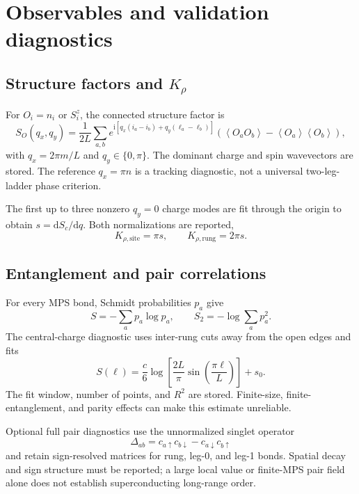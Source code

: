 \documentclass[11pt]{article}
\newcommand{\mean}[1]{\left\langle #1\right\rangle}
\newcommand{\dd}{\mathrm d}
\begin{document}
\section{Observables and validation diagnostics}
\label{sec:diagnostics}

\subsection{Structure factors and \texorpdfstring{\(K_\rho\)}{K rho}}

For \(O_i=n_i\) or \(S_i^z\), the connected structure factor is
\begin{equation}
 S_O(q_x,q_y)=\frac{1}{2L}\sum_{a,b}
 e^{\mathrm{i}[q_x(i_a-i_b)+q_y(\ell_a-\ell_b)]}
 \left(\mean{O_aO_b}-\mean{O_a}\mean{O_b}\right),
\end{equation}
with \(q_x=2\pi m/L\) and \(q_y\in\{0,\pi\}\).  The dominant charge and spin
wavevectors are stored.  The reference \(q_x=\pi n\) is a tracking diagnostic,
not a universal two-leg-ladder phase criterion.

The first up to three nonzero \(q_y=0\) charge modes are fit through the origin
to obtain \(s=\dd S_c/\dd q\).  Both normalizations are reported,
\begin{equation}
 K_{\rho,\mathrm{site}}=\pi s,
 \qquad K_{\rho,\mathrm{rung}}=2\pi s.
\end{equation}

\subsection{Entanglement and pair correlations}

For every MPS bond, Schmidt probabilities \(p_a\) give
\begin{equation}
 S=-\sum_ap_a\log p_a,
 \qquad S_2=-\log\sum_ap_a^2.
\end{equation}
The central-charge diagnostic uses inter-rung cuts away from the open edges and
fits
\begin{equation}
 S(\ell)=\frac{c}{6}\log\left[\frac{2L}{\pi}
              \sin\left(\frac{\pi\ell}{L}\right)\right]+s_0.
\end{equation}
The fit window, number of points, and \(R^2\) are stored.  Finite-size,
finite-entanglement, and parity effects can make this estimate unreliable.

Optional full pair diagnostics use the unnormalized singlet operator
\begin{equation}
 \Delta_{ab}=c_{a\uparrow}c_{b\downarrow}
             -c_{a\downarrow}c_{b\uparrow}
\end{equation}
and retain sign-resolved matrices for rung, leg-0, and leg-1 bonds.  Spatial
decay and sign structure must be reported; a large local value or finite-MPS
pair field alone does not establish superconducting long-range order.
\end{document}
